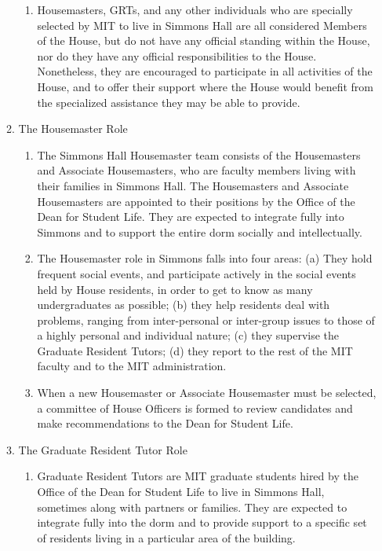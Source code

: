 \documentclass[letterpaper]{article}
\begin{document}
\begin{enumerate}
\begin{enumerate}
\begin{enumerate}
\item Housemasters, GRTs, and any other individuals who are specially selected by MIT to live in Simmons Hall are all considered Members of the House, but do not have any official standing within the House, nor do they have any official responsibilities to the House. Nonetheless, they are encouraged to participate in all activities of the House, and to offer their support where the House would benefit from the specialized assistance they may be able to provide.

\end{enumerate}

\item The Housemaster Role 

\begin{enumerate}

\item The Simmons Hall Housemaster team consists of the Housemasters and Associate Housemasters, who are faculty members living with their families in Simmons Hall. The Housemasters and Associate Housemasters are appointed to their positions by the Office of the Dean for Student Life. They are expected to integrate fully into Simmons and to support the entire dorm socially and intellectually.

\item The Housemaster role in Simmons falls into four areas: (a) They hold frequent social events, and participate actively in the social events held by House residents, in order to get to know as many undergraduates as possible; (b) they help residents deal with problems, ranging from inter-personal or inter-group issues to those of a highly personal and individual nature; (c) they supervise the Graduate Resident Tutors; (d) they report to the rest of the MIT faculty and to the MIT administration.

\item When a new Housemaster or Associate Housemaster must be selected, a committee of House Officers is formed to review candidates and make recommendations to the Dean for Student Life.

\end{enumerate}

\item The Graduate Resident Tutor Role 

\begin{enumerate}

\item Graduate Resident Tutors are MIT graduate students hired by the Office of the Dean for Student Life to live in Simmons Hall, sometimes along with partners or families. They are expected to integrate fully into the dorm and to provide support to a specific set of residents living in a particular area of the building.


\end{enumerate}
\end{enumerate}
\end{enumerate}
\end{document}
